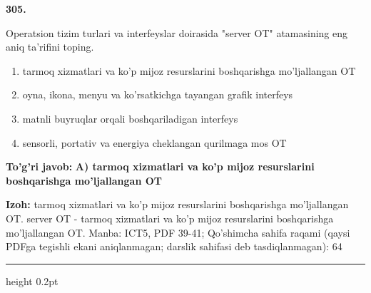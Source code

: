 \documentclass[10pt,a4paper]{article}
\begin{document}
{\bfseries\sffamily\color{ink} 305.}
\par
Operatsion tizim turlari va interfeyslar doirasida "server OT" atamasining eng aniq ta'rifini toping.
\begin{enumerate}[label=\Alph*),leftmargin=9mm]
\item tarmoq xizmatlari va ko'p mijoz resurslarini boshqarishga mo'ljallangan OT
\item oyna, ikona, menyu va ko'rsatkichga tayangan grafik interfeys
\item matnli buyruqlar orqali boshqariladigan interfeys
\item sensorli, portativ va energiya cheklangan qurilmaga mos OT
\end{enumerate}
\begin{tcolorbox}[enhanced,breakable,colback=teal!4,colframe=teal!60!black,boxrule=0.45pt,arc=1.2mm,left=2.7mm,right=2.7mm,top=1.8mm,bottom=1.8mm,before skip=2mm,after skip=2mm]
{\bfseries\sffamily\color{teal}To'g'ri javob:} \textbf{A) tarmoq xizmatlari va ko'p mijoz resurslarini boshqarishga mo'ljallangan OT}
\par\smallskip
{\bfseries Izoh:} tarmoq xizmatlari va ko'p mijoz resurslarini boshqarishga mo'ljallangan OT. server OT - tarmoq xizmatlari va ko'p mijoz resurslarini boshqarishga mo'ljallangan OT. Manba: ICT5, PDF 39-41; Qo'shimcha sahifa raqami (qaysi PDFga tegishli ekani aniqlanmagan; darslik sahifasi deb tasdiqlanmagan): 64
\end{tcolorbox}
\vspace{2mm}\hrule height 0.2pt\vspace{3mm}
\end{document}
